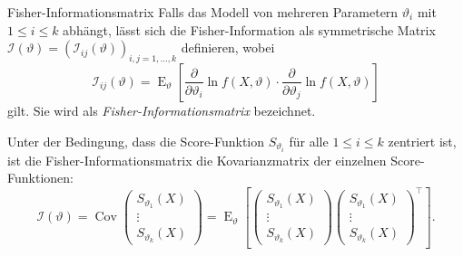 \begin{defi}{Fisher-Informationsmatrix}
    Falls das Modell von mehreren Parametern $\vartheta_i$ mit $1 \leq i \leq k$ abhängt, lässt sich die Fisher-Information als symmetrische Matrix $\mathcal{I}(\vartheta) = (\mathcal{I}_{ij}(\vartheta))_{i,j=1,\dotsc,k}$ definieren, wobei
    \[
        \mathcal{I}_{ij}(\vartheta) = \operatorname{E}_{\vartheta} \left[ \frac{\partial}{\partial \vartheta_i} \ln f(X, \vartheta) \cdot \frac{\partial}{\partial \vartheta_j} \ln f(X, \vartheta) \right]
    \]
    gilt.
    Sie wird als \emph{Fisher-Informationsmatrix} bezeichnet.

    Unter der Bedingung, dass die Score-Funktion $S_{\vartheta_i}$ für alle $1 \leq i \leq k$ zentriert ist, ist die Fisher-Informationsmatrix die Kovarianzmatrix der einzelnen Score-Funktionen:
    \[
        \mathcal{I}(\vartheta) = \operatorname{Cov} \begin{pmatrix} S_{\vartheta_1}(X) \\ \vdots \\ S_{\vartheta_k}(X) \end{pmatrix} = \operatorname{E}_{\vartheta} \left[ \begin{pmatrix} S_{\vartheta_1}(X) \\ \vdots \\ S_{\vartheta_k}(X) \end{pmatrix} \begin{pmatrix} S_{\vartheta_1}(X) \\ \vdots \\ S_{\vartheta_k}(X) \end{pmatrix}^\top \right].
    \]
\end{defi}

